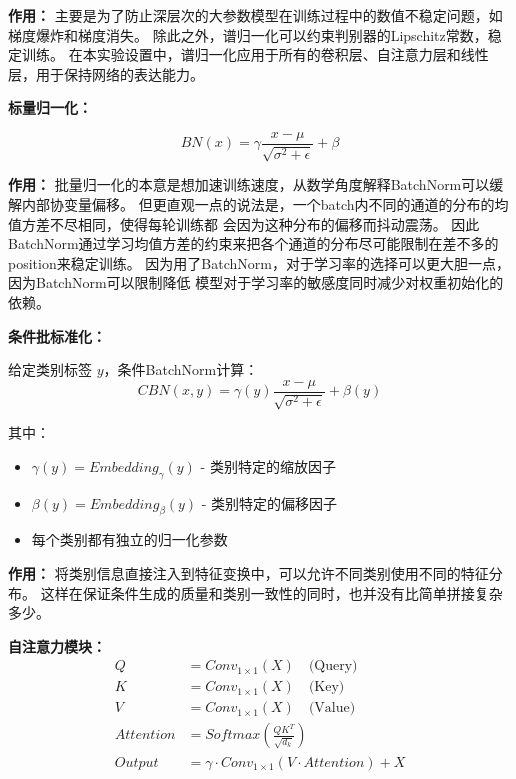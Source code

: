 \documentclass[12pt, a4paper]{article}
\begin{document}
\vspace{0.5cm}

\textbf{作用：}
主要是为了防止深层次的大参数模型在训练过程中的数值不稳定问题，如梯度爆炸和梯度消失。
除此之外，谱归一化可以约束判别器的Lipschitz常数，稳定训练。
在本实验设置中，谱归一化应用于所有的卷积层、自注意力层和线性层，用于保持网络的表达能力。


\vspace{1cm}

\begin{center}
    \textbf{标量归一化：}
\end{center}
$$BN(x) = \gamma \frac{x - \mu}{\sqrt{\sigma^2 + \epsilon}} + \beta$$

\textbf{作用：}
批量归一化的本意是想加速训练速度，从数学角度解释BatchNorm可以缓解内部协变量偏移。
但更直观一点的说法是，一个batch内不同的通道的分布的均值方差不尽相同，使得每轮训练都
会因为这种分布的偏移而抖动震荡。
因此BatchNorm通过学习均值方差的约束来把各个通道的分布尽可能限制在差不多的position来稳定训练。
因为用了BatchNorm，对于学习率的选择可以更大胆一点，因为BatchNorm可以限制降低
模型对于学习率的敏感度同时减少对权重初始化的依赖。

\vspace{1cm}

\begin{center}
    \textbf{条件批标准化：}
\end{center}
给定类别标签 $y$，条件BatchNorm计算：
$$CBN(x, y) = \gamma(y) \frac{x - \mu}{\sqrt{\sigma^2 + \epsilon}} + \beta(y)$$

其中：
\begin{itemize}
    \item $\gamma(y) = Embedding_{\gamma}(y)$ - 类别特定的缩放因子
    \item $\beta(y) = Embedding_{\beta}(y)$ - 类别特定的偏移因子
    \item 每个类别都有独立的归一化参数
\end{itemize}

\textbf{作用：}
将类别信息直接注入到特征变换中，可以允许不同类别使用不同的特征分布。
这样在保证条件生成的质量和类别一致性的同时，也并没有比简单拼接复杂多少。



\begin{center}
    \textbf{自注意力模块：}
    \begin{align}
        Q &= Conv_{1 \times 1}(X) \quad \text{(Query)} \\    
        K &= Conv_{1 \times 1}(X) \quad \text{(Key)} \\
        V &= Conv_{1 \times 1}(X) \quad \text{(Value)} \\
        Attention &= Softmax(\frac{QK^T}{\sqrt{d_k}}) \\
        Output &= \gamma \cdot Conv_{1 \times 1}(V \cdot Attention) + X
    \end{align}
\end{center}
\end{document}
